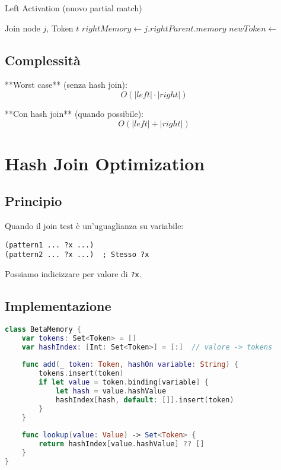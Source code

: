 \begin{algorithm}
\caption{Left Activation (nuovo partial match)}
\begin{algorithmic}[1]
\Require Join node $j$, Token $t$
  \State $rightMemory \gets j.rightParent.memory$
      \State $newToken \gets $ 
      \State {}
    \EndIf
  \EndFor
\EndFunction
\end{algorithmic}
\end{algorithm}

\subsection{Complessità}

**Worst case** (senza hash join):
\begin{equation}
O(|left| \cdot |right|)
\end{equation}

**Con hash join** (quando possibile):
\begin{equation}
O(|left| + |right|)
\end{equation}

\section{Hash Join Optimization}

\subsection{Principio}

Quando il join test è un'uguaglianza su variabile:

\begin{lstlisting}[language=CLIPS]
(pattern1 ... ?x ...)
(pattern2 ... ?x ...)  ; Stesso ?x
\end{lstlisting}

Possiamo indicizzare per valore di \texttt{?x}.

\subsection{Implementazione}

\begin{lstlisting}[language=Swift]
class BetaMemory {
    var tokens: Set<Token> = []
    var hashIndex: [Int: Set<Token>] = [:]  // valore -> tokens
    
    func add(_ token: Token, hashOn variable: String) {
        tokens.insert(token)
        if let value = token.binding[variable] {
            let hash = value.hashValue
            hashIndex[hash, default: []].insert(token)
        }
    }
    
    func lookup(value: Value) -> Set<Token> {
        return hashIndex[value.hashValue] ?? []
    }
}
\end{lstlisting}

